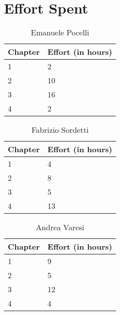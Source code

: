 \section{Effort Spent}


\begin{table}[h]
  \centering
  \caption*{Emanuele Pocelli}
  \begin{tabularx}{\textwidth}{|X|X|}
    \hline
    \textbf{Chapter} & \textbf{Effort (in hours)}\\
    \hline
    1 & 2\\
    \hline
    2 & 10\\ 
    \hline
    3 & 16\\
    \hline 
    4 & 2\\ 
    \hline
  \end{tabularx}
\end{table}

\begin{table}[h]
  \centering
  \caption*{Fabrizio Sordetti}
  \begin{tabularx}{\textwidth}{|X|X|}
    \hline
    \textbf{Chapter} & \textbf{Effort (in hours)}\\
    \hline
    1 & 4\\
    \hline
    2 & 8\\
    \hline
    3 & 5\\
    \hline 
    4 & 13\\
    \hline
  \end{tabularx}
\end{table}

\begin{table}[h]
  \centering
  \caption*{Andrea Varesi}
  \begin{tabularx}{\textwidth}{|X|X|}
    \hline
    \textbf{Chapter} & \textbf{Effort (in hours)}\\
    \hline
    1 & 9\\
    \hline
    2 & 5\\
    \hline
    3 & 12\\
    \hline 
    4 & 4\\
    \hline
  \end{tabularx}
\end{table}
